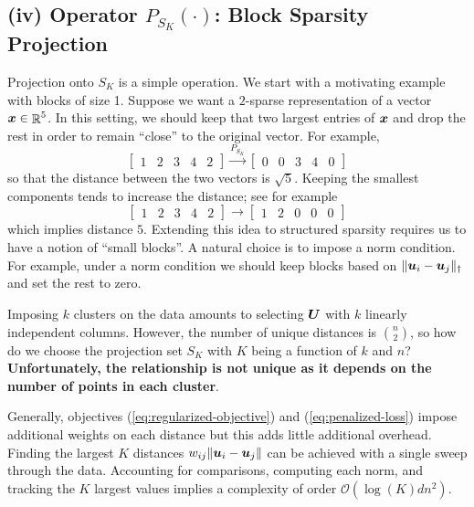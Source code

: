 \documentclass[11pt]{article}
\begin{document}
\subsection*{(iv) Operator \(P_{S_{K}}(\cdot)\): Block Sparsity Projection}

Projection onto \(S_{K}\) is a simple operation.
We start with a motivating example with blocks of size 1.
Suppose we want a \(2\)-sparse representation of a vector \(\boldsymbol{x} \in \mathop{\mathbb{R}}\nolimits^{5}\).
In this setting, we should keep that two largest entries of \(\boldsymbol{x}\) and drop the rest in order to remain ``close'' to the original vector.
For example,
\begin{equation*}
    \begin{bmatrix}
        1 & 2 & 3 & 4 & 2
    \end{bmatrix}
    \overset{P_{S_{K}}}{\longrightarrow}
    \begin{bmatrix}
        0 & 0 & 3 & 4 & 0
    \end{bmatrix}
\end{equation*}
so that the distance between the two vectors is \(\sqrt{5}\).
Keeping the smallest components tends to increase the distance; see for example
\begin{equation*}
    \begin{bmatrix}
        1 & 2 & 3 & 4 & 2
    \end{bmatrix}
    {\longrightarrow}
    \begin{bmatrix}
        1 & 2 & 0 & 0 & 0
    \end{bmatrix}
\end{equation*}
which implies distance \(5\).
Extending this idea to structured sparsity requires us to have a notion of ``small blocks''.
A natural choice is to impose a norm condition.
For example, under a norm condition we should keep blocks based on \(\|\boldsymbol{u}_{i} - \boldsymbol{u}_{j}\|_{\dagger}\) and set the rest to zero.

Imposing \(k\) clusters on the data amounts to selecting \(\boldsymbol{U}\) with \(k\) linearly independent columns.
However, the number of unique distances is \(\binom{n}{2}\), so how do we choose the projection set \(S_{K}\) with \(K\) being a function of \(k\) and \(n\)?
\textbf{Unfortunately, the relationship is not unique as it depends on the number of points in each cluster}.

Generally, objectives (\ref{eq:regularized-objective}) and (\ref{eq:penalized-loss}) impose additional weights on each distance but this adds little additional overhead.
Finding the largest \(K\) distances \(w_{ij} \| \boldsymbol{u}_{i} - \boldsymbol{u}_{j} \|\) can be achieved with a single sweep through the data.
Accounting for comparisons, computing each norm, and tracking the \(K\) largest values implies a complexity of order \(\mathcal{O}(\log(K)dn^{2})\).
\end{document}
